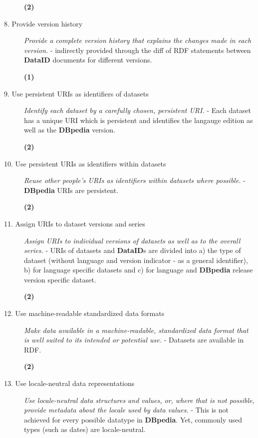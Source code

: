 \documentclass[a4paper,english,twoside,BCOR1.5cm,headsepline,DIV12,appendixprefix,final,12pt]{scrbook}
\newcommand{\dataid}{{\ttfamily\bfseries DataID}\xspace}
\newcommand{\dbpedia}{{\ttfamily\bfseries DBpedia}\xspace}
\begin{document}
\begin{description}
\begin{flushright}\color{ForestGreen}\textbf{(2)}\end{flushright}
 \item[8. Provide version history] \textit{Provide a complete version history that explains the changes made in each version.} - indirectly provided through the diff of RDF statements between \dataid documents for different versions.
\begin{flushright}\color{BurntOrange}\textbf{(1)}\end{flushright}
 \item[9. Use persistent URIs as identifiers of datasets] \textit{Identify each dataset by a carefully chosen, persistent URI.} - Each dataset has a unique URI which is persistent and identifies the langauge edition as well as the \dbpedia version.
\begin{flushright}\color{ForestGreen}\textbf{(2)}\end{flushright}
 \item[10. Use persistent URIs as identifiers within datasets] \textit{Reuse other people's URIs as identifiers within datasets where possible.} - \dbpedia URIs are persistent.
\begin{flushright}\color{ForestGreen}\textbf{(2)}\end{flushright}
 \item[11. Assign URIs to dataset versions and series] \textit{Assign URIs to individual versions of datasets as well as to the overall series.} - URIs of datasets and \dataid{}s are divided into a) the type of dataset (without language and version indicator - as a general identifier), b) for language specific datasets and c) for language and \dbpedia release version specific dataset. 
\begin{flushright}\color{ForestGreen}\textbf{(2)}\end{flushright}
 \item[12. Use machine-readable standardized data formats] \textit{Make data available in a machine-readable, standardized data format that is well suited to its intended or potential use.} - Datasets are available in RDF.
\begin{flushright}\color{ForestGreen}\textbf{(2)}\end{flushright}
 \item[13. Use locale-neutral data representations] \textit{Use locale-neutral data structures and values, or, where that is not possible, provide metadata about the locale used by data values.} - This is not achieved for every possible datatype in \dbpedia. Yet, commonly used types (such as dates) are locale-neutral.

\end{description}
\end{document}
